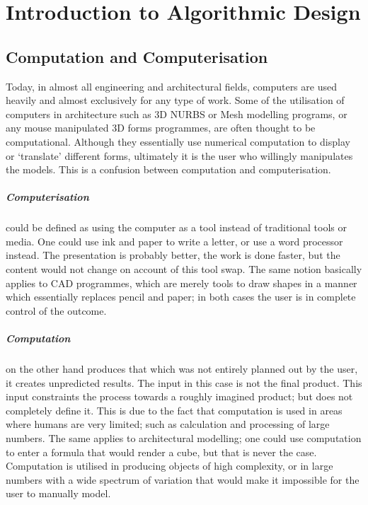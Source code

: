 \chapter{Introduction to Algorithmic Design}
\section{Computation and Computerisation}

Today, in almost all engineering and architectural fields, computers are used heavily and almost exclusively for any type of work. Some of the utilisation of computers in architecture such as 3D NURBS or Mesh modelling programs, or any mouse manipulated 3D forms programmes, are often thought to be computational. Although they essentially use numerical computation to display or `translate' \cite{terzidis06} different forms, ultimately it is the user who willingly manipulates the models.  This is a confusion between computation and computerisation. 

\paragraph{Computerisation}could be defined as using the computer as a tool instead of traditional tools or media. One could use ink and paper to write a letter, or use a word processor instead. The presentation is probably better, the work is done faster, but the content would not change on account of this tool swap. The same notion basically applies to CAD programmes, which are merely tools to draw shapes in a manner which essentially replaces pencil and paper; in both cases the user is in complete control of the outcome.

\paragraph{Computation}on the other hand produces that which was not entirely planned out by the user, it creates unpredicted results. The input in this case is not the final product. This input constraints the process towards a roughly imagined product; but does not completely define it. This is due to the fact that computation is used in areas where humans are very limited; such as calculation and processing of large numbers. The same applies to architectural modelling; one could use computation to enter a formula that would render a cube, but that is never the case. Computation is utilised in producing objects of high complexity, or in large numbers with a wide spectrum of variation that would make it impossible for the user to manually model.

